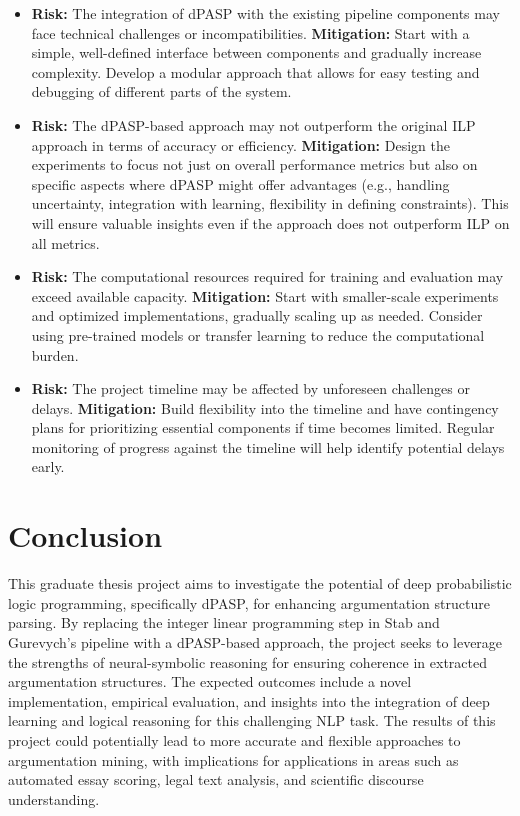 \documentclass{article}
\begin{document}
\begin{itemize}
    \item \textbf{Risk:} The integration of dPASP with the existing pipeline
    components may face technical challenges or incompatibilities.
    \textbf{Mitigation:} Start with a simple, well-defined interface between
    components and gradually increase complexity. Develop a modular approach
    that allows for easy testing and debugging of different parts of the system.
    
    \item \textbf{Risk:} The dPASP-based approach may not outperform the
    original ILP approach in terms of accuracy or efficiency.
    \textbf{Mitigation:} Design the experiments to focus not just on overall
    performance metrics but also on specific aspects where dPASP might offer
    advantages (e.g., handling uncertainty, integration with learning,
    flexibility in defining constraints). This will ensure valuable insights
    even if the approach does not outperform ILP on all metrics.
    
    \item \textbf{Risk:} The computational resources required for training and
    evaluation may exceed available capacity.
    \textbf{Mitigation:} Start with smaller-scale experiments and optimized
    implementations, gradually scaling up as needed. Consider using pre-trained
    models or transfer learning to reduce the computational burden.
    
    \item \textbf{Risk:} The project timeline may be affected by unforeseen
    challenges or delays.
    \textbf{Mitigation:} Build flexibility into the timeline and have
    contingency plans for prioritizing essential components if time becomes
    limited. Regular monitoring of progress against the timeline will help
    identify potential delays early.
\end{itemize}

\section{Conclusion}

This graduate thesis project aims to investigate the potential of deep
probabilistic logic programming, specifically dPASP, for enhancing argumentation
structure parsing. By replacing the integer linear programming step in Stab and
Gurevych's pipeline with a dPASP-based approach, the project seeks to leverage
the strengths of neural-symbolic reasoning for ensuring coherence in extracted
argumentation structures. The expected outcomes include a novel implementation,
empirical evaluation, and insights into the integration of deep learning and
logical reasoning for this challenging NLP task. The results of this project
could potentially lead to more accurate and flexible approaches to argumentation
mining, with implications for applications in areas such as automated essay
scoring, legal text analysis, and scientific discourse understanding.



\end{document}
